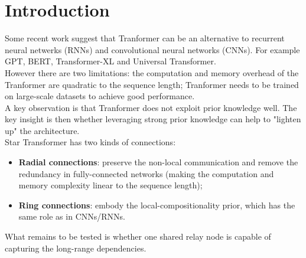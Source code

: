 \section{Introduction}

Some recent work suggest that Tranformer can be an alternative to recurrent
neural netwerks (RNNs) and convolutional neural networks (CNNs). For example
GPT, BERT, Transformer-XL and Universal Transformer.\\
However there are two limitations: the computation and memory overhead of the
Tranformer are quadratic to the sequence length; Tranformer needs to be trained
on large-scale datasets to achieve good performance.\\
A key observation is that Tranformer does not exploit prior knowledge well. The
key insight is then whether leveraging strong prior knowledge can help to
"lighten up" the architecture.\\
Star Transformer has two kinds of connections:
\begin{itemize}
    \item \textbf{Radial connections}: preserve the non-local communication and
        remove the redundancy in fully-connected networks (making the 
        computation and memory complexity linear to the sequence length);

    \item \textbf{Ring connections}: embody the local-compositionality prior,
        which has the same role as in CNNs/RNNs.
\end{itemize}

What remains to be tested is whether one shared relay node is capable of
capturing the long-range dependencies.
